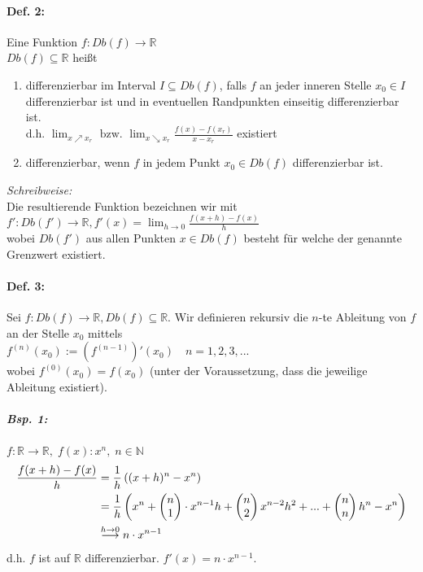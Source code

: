 \paragraph{Def. 2:} Eine Funktion $f: Db(f)\to \mathbb{R}$\\
$Db(f)\subseteq \mathbb{R}$ heißt
\begin{enumerate}[label=\alph*.)]
\item differenzierbar im Interval $I \subseteq Db(f)$, falls $f$ an jeder inneren Stelle $x_0\in I$ differenzierbar ist und in eventuellen Randpunkten einseitig differenzierbar ist.\\
d.h. $\lim_{x\nearrow x_r} \text{ bzw. } \lim_{x\searrow x_r} \frac{f(x)-f(x_r)}{x-x_r}$ existiert
\item differenzierbar, wenn $f$ in jedem Punkt $x_0 \in Db(f)$ differenzierbar ist.
\end{enumerate}
\emph{Schreibweise:}\\
Die resultierende Funktion bezeichnen wir mit \\
$f': Db(f')\to \mathbb{R}, f'(x)=\lim_{h\to 0} \frac{f(x+h)-f(x)}{h}$\\
wobei $Db(f')$ aus allen Punkten $x \in Db(f)$ besteht für welche der genannte Grenzwert existiert.

\paragraph{Def. 3:} Sei $f: Db(f) \to \mathbb{R}, Db(f) \subseteq \mathbb{R}$. Wir definieren rekursiv die $n$-te Ableitung von $f$ an der Stelle $x_0$ mittels\\
$f^{(n)}(x_0):= \left(f^{(n-1)}\right)'(x_0) \quad n=1,2,3,...$\\
wobei $f^{(0)}(x_0)=f(x_0)$ (unter der Voraussetzung, dass die jeweilige Ableitung existiert).

\subparagraph{Bsp. 1:} $f: \mathbb{R}\to \mathbb{R}, \; f(x): x^n, \; n \in \mathbb{N}$
\begin{align*}
\frac{f(x+h)-f(x)}{h}&=\frac{1}{h}\left((x+h)^n-x^n\right)\\
&=\frac{1}{h}\left(x^n+\begin{pmatrix}n\\1\end{pmatrix}\cdot x^{n-1}h+\begin{pmatrix}n\\2\end{pmatrix}x^{n-2}h^2+...+\begin{pmatrix}n\\n\end{pmatrix}h^n-x^n\right)\\
&\overset{h\to 0}{\longrightarrow}n\cdot x^{n-1}
\end{align*}
d.h. $f$ ist auf $\mathbb{R}$ differenzierbar. $f'(x)=n\cdot x^{n-1}$.

